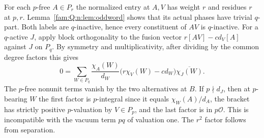 \documentclass[11pt,a4paper]{article}
\numberwithin{equation}{section}
\theoremstyle{remark}
\begin{document}
For each $p$-free $A\in P_r$ the normalized entry at $A,V$ has
weight $r$ and residues $r$ at $p,r$. Lemma~\ref{fam:Q:n:lem:oddword}
shows that its actual phases have trivial $q$-part. Both labels
are $q$-inactive, hence every constituent of $AV$ is $q$-inactive.
For a $q$-active $J$, apply block orthogonality to the fusion vector
$r[AV]-c d_V[A]$ against $J$ on $P_q$. By symmetry and
multiplicativity, after dividing by the common degree factors this gives
\[
 0=\sum_{W\in P_q}\frac{\chi_A(W)}{d_W}
       \bigl(r\chi_V(W)-c d_W\bigr)\overline{\chi_J(W)} .
\]
The $p$-free nonunit terms vanish by the two alternatives at $B$.
If $p\nmid d_J$, then at $p$-bearing $W$ the first factor is
$p$-integral since it equals $\chi_W(A)/d_A$, the bracket has
strictly positive $p$-valuation by $V\in P_p$, and the last
factor is in $p\mathcal O$. This is incompatible with the vacuum
term $pq$ of valuation one. The $r^2$ factor follows from separation.
\end{document}
